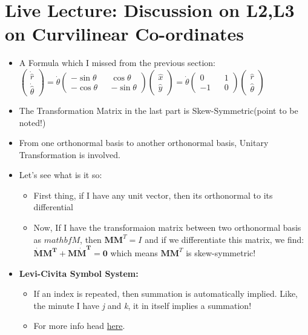 \documentclass{article}
\begin{document}
\section{Live Lecture: Discussion on L2,L3 on Curvilinear Co-ordinates}
\begin{itemize}
  \item A Formula which I missed from the previous  section: \\
  $\begin{pmatrix}
    \dot{\hat{r}} \\
    \dot{\hat{\theta}}
  \end{pmatrix}
 = \dot{\theta}
 \begin{pmatrix}
  -\sin \theta && \cos \theta \\
  -\cos \theta && - \sin \theta
 \end{pmatrix}
 \begin{pmatrix}
   {\hat{x}} \\
   {\hat{y}}
 \end{pmatrix}
 = \dot{\theta}
 \begin{pmatrix}
   0 && 1 \\
   -1 && 0
 \end{pmatrix}
 \begin{pmatrix}
   \hat{r} \\
   \hat{\theta}
 \end{pmatrix}
  $

  \item The Transformation Matrix in the last part is Skew-Symmetric(point to be noted!)
  \item From one orthonormal basis to another orthonormal basis, Unitary Transformation is involved.
  \item Let's see what is it so:
    \begin{itemize}
      \item First thing, if I have any unit vector, then its orthonormal to its differential
      \item Now, If I have the transformaion matrix between two orthonormal basis as $mathbf{M}$, then $\mathbf{MM}^{T} = I$ and if we differentiate this matrix, we find:
      $\mathbf{\dot{M}M^T + M\dot{M}^T = 0}$ which means $\mathbf{MM}^{T}$ is skew-symmetric!
    \end{itemize}
  \item \textbf{Levi-Civita Symbol System:}
  \begin{itemize}
    \item If an index is repeated, then summation is automatically implied.
    Like, the minute I have \textit{j} and \textit{k}, it in itself implies a summation!
    \item For more info head \href{http://www.physics.usu.edu/Wheeler/ClassicalMechanics/CMnotesLeviCivita.pdf}{here}.
  \end{itemize}

\end{itemize}
\end{document}
